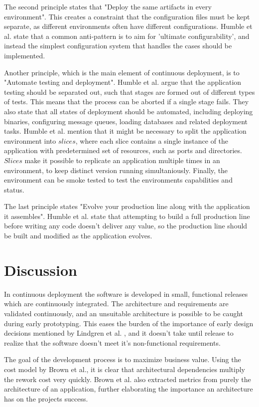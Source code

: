 \documentclass[conference]{IEEEtran}
\begin{document}
The second principle states that "Deploy the same artifacts in every environment". This creates a constraint that the configuration files must be kept separate, as different environments often have different configurations. Humble et al. state that a common anti-pattern is to aim for 'ultimate configurability', and instead the simplest configuration system that handles the cases should be implemented.

Another principle, which is the main element of continuous deployment, is to "Automate testing and deployment". Humble et al. argue that the application testing should be separated out, such that stages are formed out of different types of tests. This means that the process can be aborted if a single stage fails. They also state that all states of deployment should be automated, including deploying binaries, configuring message queues, loading databases and related deployment tasks. Humble et al. mention that it might be necessary to split the application environment into $slices$, where each slice contains a single instance of the application with predetermined set of resources, such as ports and directories. $Slices$ make it possible to replicate an application multiple times in an environment, to keep distinct version running simultaniously. Finally, the environment can be smoke tested to test the environments capabilities and status.

The last principle states "Evolve your production line along with the application it assembles". Humble et al. state that attempting to build a full production line before writing any code doesn't deliver any value, so the production line should be built and modified as the application evolves. 

\section{Discussion} %

In continuous deployment the software is developed in small, functional releases which are continuously integrated. The architecture and requirements are validated continuously, and an unsuitable architecture is possible to be caught during early prototyping. This eases the burden of the importance of early design decisions mentioned by Lindgren et al. \cite{bass2003software}, and it doesn't take until release to realize that the software doesn't meet it's non-functional requirements.

The goal of the development process is to maximize business value. Using the cost model \cite{brown2011analysis} by Brown et al., it is clear that architectural dependencies multiply the rework cost very quickly. Brown et al. also extracted metrics from purely the architecture of an application, further elaborating the importance an architecture has on the projects success.
\end{document}
